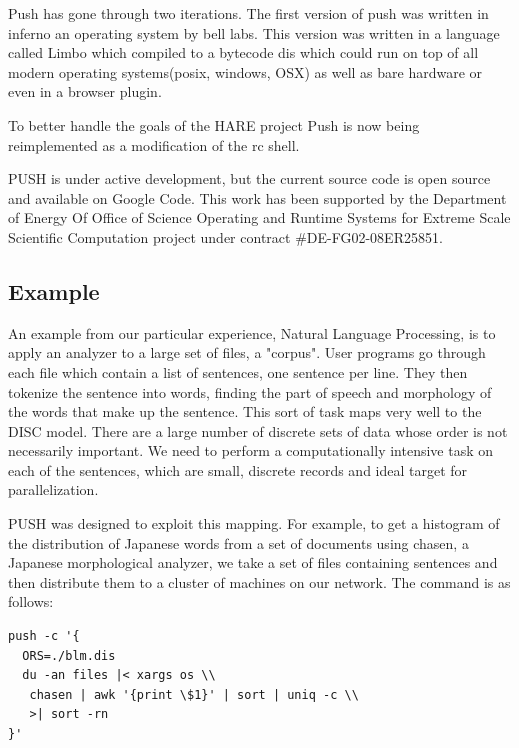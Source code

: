 \documentclass{sig-alt-release2}
\begin{document}
Push has gone through two iterations. The first version of push was written in inferno\cite{} an operating system by bell labs. This version was written in a language called Limbo which compiled to a bytecode dis which could run on top of all modern operating systems(posix, windows, OSX) as well as bare hardware or even in a browser plugin. 

To better handle the goals of the HARE project Push is now being reimplemented as a modification of the rc\cite{} shell. 

PUSH is under active development, but the current source code is open source 
and available on Google Code.
This work has been supported by the Department of Energy Of Office of Science Operating and Runtime Systems for Extreme Scale Scientific Computation project under contract \#DE-FG02-08ER25851. 

\subsection{Example}
An example from our particular experience, Natural Language Processing, is 
to apply an analyzer to a large set of files, a "corpus". User programs go 
through each file which contain a list of sentences, one sentence per line. 
They then tokenize the sentence into words, finding the part of speech and 
morphology of the words that make up the sentence.
This sort of task maps very well to the DISC model. There are a large number of 
discrete sets of data whose order is not necessarily important. We need to 
perform a computationally intensive task on each of the sentences, which are 
small, discrete records and ideal target for parallelization. 

PUSH was designed to exploit this mapping. For example, to get a histogram of 
the distribution of Japanese words from a set of documents using chasen, 
a Japanese morphological analyzer, we take a set of files containing sentences 
and then distribute them to a cluster of machines on our network. The command 
is as follows:

\begin{verbatim}
push -c '{
  ORS=./blm.dis
  du -an files |< xargs os \\
   chasen | awk '{print \$1}' | sort | uniq -c \\
   >| sort -rn
}'
\end{verbatim}
\end{document}
